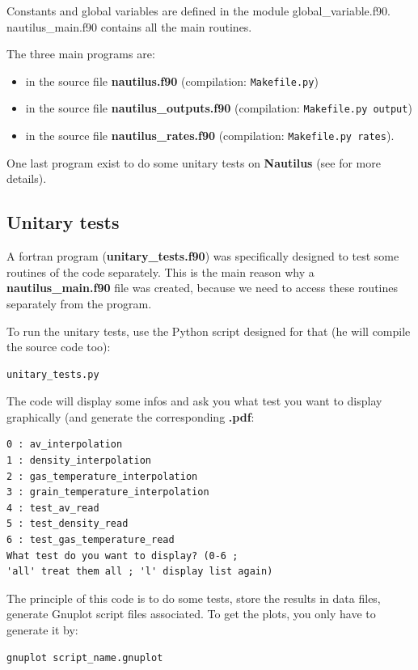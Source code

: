 \documentclass[english,a4paper,twoside]{article}
\begin{document}
Constants and global variables are defined in the module global\_variable.f90. nautilus\_main.f90 contains all the main routines. 

The three main programs are:
\begin{itemize}
\item {} in the source file \textbf{nautilus.f90} (compilation:  \verb|Makefile.py|)
\item {} in the source file \textbf{nautilus\_outputs.f90} (compilation: \verb|Makefile.py output|)
\item {} in the source file \textbf{nautilus\_rates.f90} (compilation: \verb|Makefile.py rates|).
\end{itemize}

One last program exist to do some unitary tests on \textbf{Nautilus} (see  for more details).

\subsection{Unitary tests}\label{sec:unitary_tests}
A fortran program  (\textbf{unitary\_tests.f90}) was specifically designed to test some routines of the code separately. This is the main reason why a \textbf{nautilus\_main.f90} file was created, because we need to access these routines separately from the  program.

To run the unitary tests, use the Python script designed for that (he will compile the source code too): 
\begin{verbatim}
unitary_tests.py
\end{verbatim}

The code will display some infos and ask you what test you want to display graphically (and generate the corresponding \textbf{.pdf}:
\begin{verbatim}
0 : av_interpolation
1 : density_interpolation
2 : gas_temperature_interpolation
3 : grain_temperature_interpolation
4 : test_av_read
5 : test_density_read
6 : test_gas_temperature_read
What test do you want to display? (0-6 ; 
'all' treat them all ; 'l' display list again)
\end{verbatim}

The principle of this code is to do some tests, store the results in data files, generate Gnuplot script files associated. To get the plots, you only have to generate it by:
\begin{verbatim}
gnuplot script_name.gnuplot
\end{verbatim}
\end{document}
